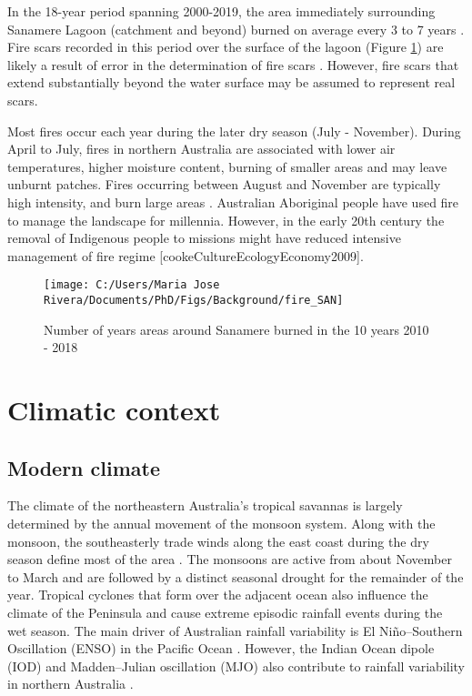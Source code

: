 \documentclass[
  12pt,
]{book}
\begin{document}
In the 18-year period spanning 2000-2019, the area immediately surrounding Sanamere Lagoon (catchment and beyond) burned on average every 3 to 7 years \citep{northaustraliarangelandsfireinformationData2020}. Fire scars recorded in this period over the surface of the lagoon (Figure \ref{fig:fig-fire-SAN}) are likely a result of error in the determination of fire scars \citep{rehnFireEnvironmentalChange2020}. However, fire scars that extend substantially beyond the water surface may be assumed to represent real scars.

Most fires occur each year during the later dry season (July - November). During April to July, fires in northern Australia are associated with lower air temperatures, higher moisture content, burning of smaller areas and may leave unburnt patches. Fires occurring between August and November are typically high intensity, and burn large areas \citep{evansDeliveringEffectiveSavanna2020}. Australian Aboriginal people have used fire to manage the landscape for millennia. However, in the early 20th century the removal of Indigenous people to missions might have reduced intensive management of fire regime {[}cookeCultureEcologyEconomy2009{]}.

\begin{figure}

{\centering \texttt{[image: C:/Users/Maria Jose Rivera/Documents/PhD/Figs/Background/fire\_SAN]} 

}

\caption{Number of years areas around Sanamere burned in the 10 years 2010 - 2018}\label{fig:fig-fire-SAN}
\end{figure}



\hypertarget{climatic-context}{%
\section{Climatic context}\label{climatic-context}}

\hypertarget{modern-climate}{%
\subsection{Modern climate}\label{modern-climate}}

The climate of the northeastern Australia's tropical savannas is largely determined by the annual movement of the monsoon system. Along with the monsoon, the southeasterly trade winds along the east coast during the dry season define most of the area \citep{shiClimateDataTheir2016}. The monsoons are active from about November to March and are followed by a distinct seasonal drought for the remainder of the year. Tropical cyclones that form over the adjacent ocean also influence the climate of the Peninsula and cause extreme episodic rainfall events during the wet season. The main driver of Australian rainfall variability is El Niño--Southern Oscillation (ENSO) in the Pacific Ocean \citep{risbeyRemoteDriversRainfall2009}. However, the Indian Ocean dipole (IOD) and Madden--Julian oscillation (MJO) also contribute to rainfall variability in northern Australia \citep{bomAustralianClimateInfluences2010}.
\end{document}
